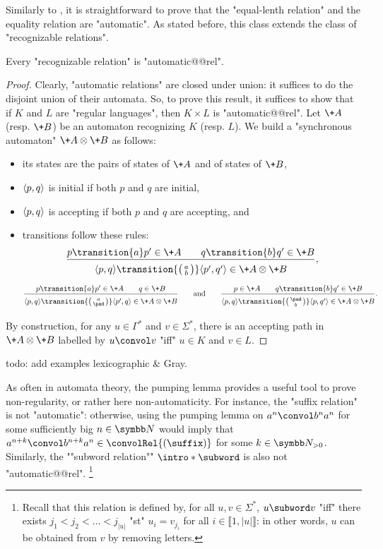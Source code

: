 Similarly to ,
it is straightforward to prove that the "equal-lenth relation"
and the equality relation are "automatic". As stated before, this class extends
the class of "recognizable relations".

\begin{proposition}
	Every "recognizable relation" is "automatic@@rel".
\end{proposition}

\begin{proof}
	Clearly, "automatic relations" are closed under union: it suffices to do the disjoint union
	of their automata.
	So, to prove this result, it suffices to show that if $K$ and $L$ are "regular languages",
	then $K \times L$ is "automatic@@rel".
	Let $\+A$ (resp. $\+B$) be an automaton recognizing $K$ (resp. $L$). 
	We build a "synchronous automaton" $\+A \otimes \+B$ as follows:
	\begin{itemize}
		\item its states are the pairs of states of $\+A$ and of states of $\+B$,
		\item $\langle p,q\rangle$ is initial if both $p$ and $q$ are initial,
		\item $\langle p,q\rangle$ is accepting if both $p$ and $q$ are accepting, and
		\item transitions follow these rules:
		\[\frac{
			p \transition{a} p' \in \+A \qquad q \transition{b} q' \in \+B
		}{
			\vphantom{\Big()}
			\tup{p,q} \transition{\pair{a}{b}} \tup{p',q'}
				\in \+A \otimes \+B
		},\]
		\vspace{-1em}
		\[\frac{
			p \transition{a} p' \in \+A \qquad q \in \+B
		}{
			\vphantom{\Big()}
			\tup{p,q} \transition{\pair{a}{\pad}} \tup{p',q}
				\in \+A \otimes \+B
		}
		\qquad\text{and}\qquad
		\frac{
			p \in \+A \qquad q \transition{b} q' \in \+B
		}{
			\vphantom{\Big()}
			\tup{p,q} \transition{\pair{\pad}{b}} \tup{p,q'}
				\in \+A \otimes \+B
		}.
		\]
	\end{itemize}
	By construction, for any $u\in \Gamma^*$ and $v\in \Sigma^*$,
	there is an accepting path in $\+A \otimes \+B$ labelled by $u \convol v$ 
	"iff" $u \in K$ and $v\in L$.
\end{proof}

todo: add examples lexicographic \& Gray.

As often in automata theory, the pumping lemma provides a useful tool to prove
non-regularity, or rather here non-automaticity.
For instance, the "suffix relation" is not "automatic": otherwise,
using the pumping lemma on $a^n \convol b^n a^n$ for some sufficiently big $n\in\N$
would imply that $a^{n+k} \convol b^{n+k} a^n \in \convolRel{(\suffix)}$ for some $k\in\Np$.
Similarly, the \AP""subword relation"" $\intro*\subword$ is also not "automatic@@rel".%
\footnote{Recall that this relation is defined by, for all $u, v \in \Sigma^*$,
$u \subword v$ "iff" there exists $j_1 < j_2 < \hdots < j_{|u|}$ "st" $u_i = v_{j_{i}}$
for all $i \in \lBrack 1, |u|\rBrack$: in other words, $u$ can be obtained from $v$ by removing letters.}

